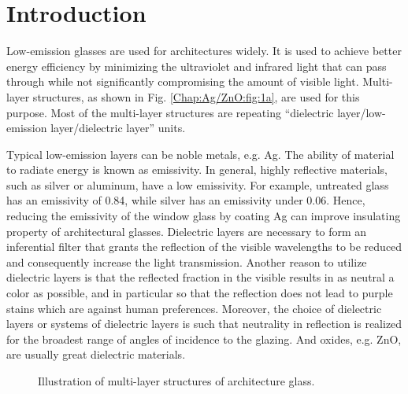 \section{Introduction}

Low-emission glasses are used for architectures widely. It is used to achieve better energy efficiency by minimizing the ultraviolet and infrared light that can pass through while not significantly compromising the amount of visible light. Multi-layer structures, as shown in Fig. \ref{Chap:Ag/ZnO:fig:1a}, are used for this purpose. Most of the multi-layer structures are repeating ``dielectric layer/low-emission layer/dielectric layer'' units.

Typical low-emission layers can be noble metals, e.g. Ag. The ability of material to radiate energy is known as emissivity. In general, highly reflective materials, such as silver or aluminum, have a low emissivity. For example, untreated glass has an emissivity of 0.84, while silver has an emissivity under 0.06. \cite{salisbury1992emissivity} Hence, reducing the emissivity of the window glass by coating Ag can improve insulating property of architectural glasses. Dielectric layers are necessary to form an inferential filter that grants the reflection of the visible wavelengths to be reduced and consequently increase the light transmission. Another reason to utilize dielectric layers is that the reflected fraction in the visible results in as neutral a color as possible, and in particular so that the reflection does not lead to purple stains which are against human preferences. Moreover, the choice of dielectric layers or systems of dielectric layers is such that neutrality in reflection is realized for the broadest range of angles of incidence to the glazing. And oxides, e.g. ZnO, are usually great dielectric materials.

\newpage
\begingroup
\begin{figure}[!ht]
  \centering
  \label{Chap:Ag/ZnO:fig:1a}
\caption[Illustration of multi-layer structures and thin film morphology]{Illustration of multi-layer structures of architecture glass.}
  \label{Chap:Ag/ZnO:fig1}
\end{figure}
\endgroup

